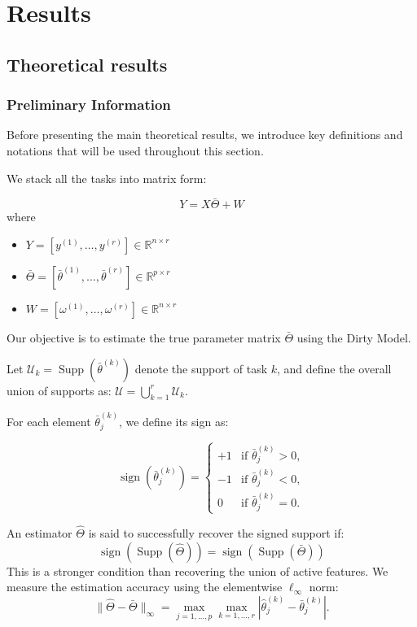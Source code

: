\documentclass{article}
\begin{document}
\section{Results}
\subsection{Theoretical results}
\subsubsection{Preliminary Information}
Before presenting the main theoretical results, we introduce key definitions and notations that will be used throughout this section.

We stack all the tasks into matrix form:



$$Y = X\bar{\Theta} + W$$
where 
\begin{itemize}
    \item $Y = [y^{(1)}, \dots, y^{(r)}] \in \mathbb{R}^{n \times r}$
    \item $\bar{\Theta} = [\bar{\theta}^{(1)}, \dots, \bar{\theta}^{(r)}] \in \mathbb{R}^{p \times r}$
    \item $W = [\omega^{(1)}, \dots, \omega^{(r)}] \in \mathbb{R}^{n \times r}$
\end{itemize}





Our objective is to estimate the true parameter matrix $\bar{\Theta}$ using the Dirty Model.

Let $\mathcal{U}_k = \operatorname{Supp}(\bar{\theta}^{(k)})$ denote the support of task $k$, and define the overall union of supports as:
$\mathcal{U} = \bigcup_{k=1}^{r} \mathcal{U}_k.$

For each element $\bar{\theta}^{(k)}_j$, we define its sign as:


$$ 
\operatorname{sign}(\bar{\theta}^{(k)}_j) =
\begin{cases}
+1 & \text{if } \bar{\theta}^{(k)}_j > 0, \\
-1 & \text{if } \bar{\theta}^{(k)}_j < 0, \\
0 & \text{if } \bar{\theta}^{(k)}_j = 0.
\end{cases}
$$




An estimator $\hat{\Theta}$ is said to successfully recover the signed support if:
$$\operatorname{sign}(\operatorname{Supp}(\hat{\Theta})) = \operatorname{sign}(\operatorname{Supp}(\bar{\Theta}))$$
This is a stronger condition than recovering the union of active features.
We measure the estimation accuracy using the elementwise $\ell_{\infty}$ norm:
\begin{equation*}
\|\hat{\Theta} - \bar{\Theta}\|_{\infty} =
\max_{j=1,\dots,p} \max_{k=1,\dots,r}
\left| \hat{\theta}^{(k)}_j - \bar{\theta}^{(k)}_j \right|.
\end{equation*}
\end{document}
